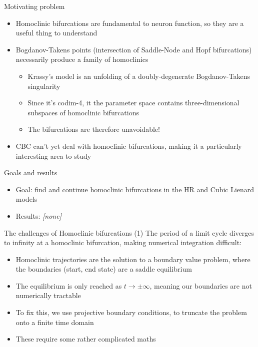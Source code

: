 \documentclass[presentation]{beamer}
\begin{document}
\begin{frame}[label={sec:org01ad99d}]{Motivating problem}
\begin{itemize}
\item Homoclinic bifurcations are fundamental to neuron function, so they are a useful thing to understand
\item Bogdanov-Takens points (intersection of Saddle-Node and Hopf bifurcations) necessarily produce a family of homoclinics
\begin{itemize}
\item Krassy's model is an unfolding of a doubly-degenerate Bogdanov-Takens singularity
\item Since it's codim-4, it the parameter space contains three-dimensional subspaces of homoclinic bifurcations
\item The bifurcations are therefore unavoidable!
\end{itemize}
\item CBC can't yet deal with homoclinic bifurcations, making it a particularly interesting area to study
\end{itemize}
\end{frame}

\begin{frame}[label={sec:org2a57769}]{Goals and results}
\begin{itemize}
\item Goal: find and continue homoclinic bifurcations in the HR and Cubic Lienard models
\item Results: \emph{[none]}
\end{itemize}
\end{frame}
\begin{frame}[label={sec:org80b433c}]{The challenges of Homoclinic bifurcations (1)}
The period of a limit cycle diverges to infinity at a homoclinic bifurcation, making numerical integration difficult:
\begin{itemize}
\item Homoclinic trajectories are the solution to a boundary value problem, where the boundaries (start, end state) are a saddle equilibrium
\item The equilibrium is only reached as \(t \to \pm \infty\), meaning our boundaries are not numerically tractable
\item To fix this, we use projective boundary conditions, to truncate the problem onto a finite time domain
\item These require some rather complicated maths
\end{itemize}
\end{frame}
\end{document}
